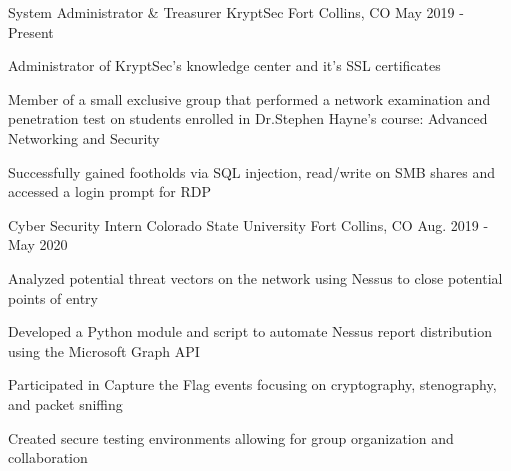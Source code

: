 \vspace{-5.0mm}


\begin{cventries}
  
\cventry
  {System Administrator \& Treasurer} %
  {KryptSec} %
  {Fort Collins, CO} %
  {May 2019 - Present} %
  {
    \begin{cvitems} %
      \item {Administrator of KryptSec’s knowledge center and it’s SSL certificates}
      \item {Member of a small exclusive group that performed a network examination and penetration test on students enrolled in Dr.Stephen Hayne’s course: Advanced Networking and Security}
      \item {Successfully gained footholds via SQL injection, read/write on SMB shares and accessed a login prompt for RDP}
    \end{cvitems}
  }

  \cventry
    {Cyber Security Intern} %
    {Colorado State University} %
    {Fort Collins, CO} %
    {Aug. 2019 - May 2020} %
    {
      \begin{cvitems} %
        \item {Analyzed potential threat vectors on the network using Nessus to close potential points of entry}
        \item {Developed a Python module and script to automate Nessus report distribution using the Microsoft Graph API}
        \item {Participated in Capture the Flag events focusing on cryptography, stenography, and packet sniffing}
        \item {Created secure testing environments allowing for group organization and collaboration}
      \end{cvitems}
    }


\end{cventries}
